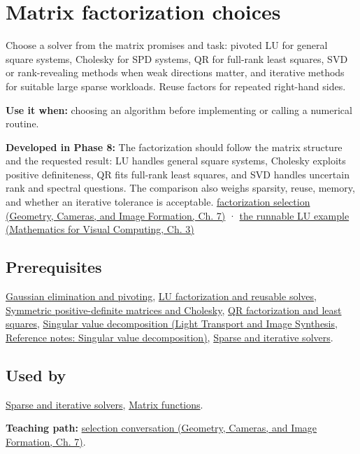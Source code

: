 \hypertarget{appendix-221a483bec2d}{}\label{referencestart:appendix-221a483bec2d}
\section{Matrix factorization choices}\label{appendix-221a483bec2d-matrix-factorization-choices}

Choose a solver from the matrix promises and task: pivoted LU for general square systems, Cholesky for SPD systems, QR for full-rank least squares, SVD or rank-revealing methods when weak directions matter, and iterative methods for suitable large sparse workloads. Reuse factors for repeated right-hand sides.

\textbf{Use it when:} choosing an algorithm before implementing or calling a numerical routine.

\textbf{Developed in Phase 8:} The factorization should follow the matrix structure and the requested result: LU handles general square systems, Cholesky exploits positive definiteness, QR fits full-rank least squares, and SVD handles uncertain rank and spectral questions. The comparison also weighs sparsity, reuse, memory, and whether an iterative tolerance is acceptable. \href{../03-Geometry-Cameras-and-Image-Formation/main.pdf\#nameddest=02-foundations-ii-ch038-choose-a-factorization-from-structure-and-the-requested-answer}{factorization selection (Geometry, Cameras, and Image Formation, Ch. 7)} · \href{../02-Mathematics-for-Visual-Computing/main.pdf\#nameddest=01-foundations-i-ch019-a-runnable-pivoted-lu-reference-preserves-the-elimination-history}{the runnable LU example (Mathematics for Visual Computing, Ch. 3)}

\subsection{Prerequisites}\label{appendix-221a483bec2d-prerequisites}

\hyperref[appendix-f6e77f4a200f]{Gaussian elimination and pivoting}, \hyperref[appendix-55e4b5b0a1e6]{LU factorization and reusable solves}, \hyperref[appendix-50d2ea3c9b26]{Symmetric positive-definite matrices and Cholesky}, \hyperref[appendix-c3421e6b4f2c]{QR factorization and least squares}, \href{../04-Light-Transport-and-Image-Synthesis/main.pdf\#nameddest=appendix-1fad5e7f36fa}{Singular value decomposition (Light Transport and Image Synthesis, Reference notes: Singular value decomposition)}, \hyperref[appendix-67c87a3d9e94]{Sparse and iterative solvers}.

\subsection{Used by}\label{appendix-221a483bec2d-used-by}

\hyperref[appendix-67c87a3d9e94]{Sparse and iterative solvers}, \hyperref[appendix-0f4bc2bf2b1f]{Matrix functions}.

\textbf{Teaching path:} \href{../03-Geometry-Cameras-and-Image-Formation/main.pdf\#nameddest=02-foundations-ii-ch038-close-the-journey-with-an-algorithm-selection-conversation}{selection conversation (Geometry, Cameras, and Image Formation, Ch. 7)}.
